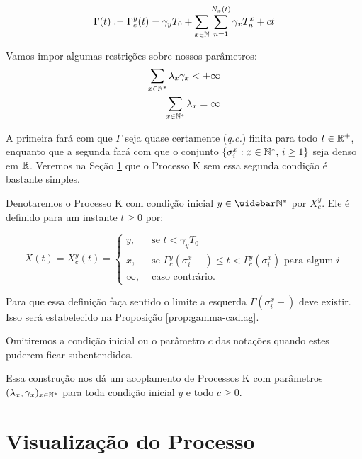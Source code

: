 \begin{equation}
  \label{def:Gamma}
  \Gamma(t) := \Gamma^y_c (t) = \gamma_y T_0
  + \sum_{x \in {\mathbb{N}}} \sum_{n = 1}^{N_x(t)}
  \gamma_x T_n^x
  + ct
\end{equation}

Vamos impor algumas restrições sobre nossos parâmetros:
\begin{align}
  \label{eq:rest-gamma-lambda}
  \sum_{x \in {\mathbb{N^*}}} \lambda_x\gamma_x < +\infty\\
  \label{eq:rest-lambda}
  \sum_{x \in {\mathbb{N^*}}} \lambda_x = \infty
\end{align}

A primeira fará com que $\Gamma$ seja quase certamente (\emph{q.c.}) finita
para todo $t \in {\mathbb{R}}^+$, enquanto que a segunda fará com que o conjunto
$\{\sigma^x_i: x \in {\mathbb{N^*}}, \, i \geq 1\}$ seja denso em ${\mathbb{R}}$. Veremos
na Seção \ref{sec:visualizacao} que o Processo K sem essa segunda
condição é bastante simples.

Denotaremos o Processo K com condição inicial $y \in \Nzb$ por
$X^y_c$. Ele é definido para um instante $t \geq 0$ por:

\begin{equation}
  \label{def:procK}
  X(t) = X^y_c (t) =
  \begin{cases}
    y, & \textrm{ se }  t < \gamma_y T_0\\
    x, & \textrm{ se } \Gamma^y_c(\sigma_i^x-) \leq t <
    \Gamma^y_c(\sigma^x_i)
    \textrm{ para algum } i \\
    \infty, & \textrm{ caso contrário.}
  \end{cases}
\end{equation}

Para que essa definição faça sentido o limite a esquerda $\Gamma
(\sigma_i^x-)$ deve existir. Isso será estabelecido na Proposição
\ref{prop:gamma-cadlag}.

Omitiremos a condição inicial ou o parâmetro $c$ das notações quando
estes puderem ficar subentendidos.

Essa construção nos dá um acoplamento de Processos K com parâmetros
$(\lambda_x, \gamma_x)_{x \in {\mathbb{N^*}}}$ para toda condição inicial $y$ e
todo $c \geq 0$.



\section{Visualização do Processo}
\label{sec:visualizacao}


